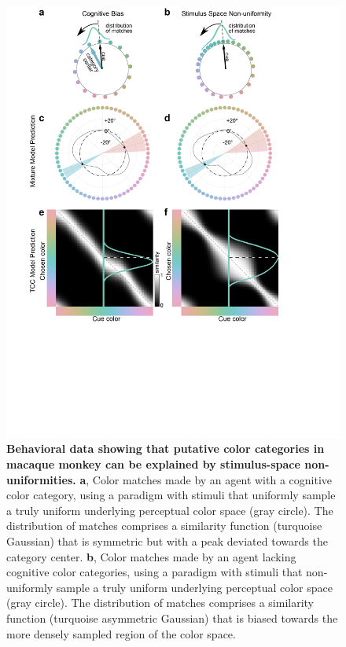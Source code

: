 \begin{figure}
    \begin{fullwidth}
    \centering
    \includegraphics[width=\textwidth+4cm,trim={0 7cm 0 0},clip]{../Figures/flat/F3_TCCModel_6.jpg}
    \caption{\textbf{Behavioral data showing that putative color categories in macaque monkey can be explained by stimulus-space non-uniformities.} \textbf{a}, Color matches made by an agent with a cognitive color category, using a paradigm with stimuli that uniformly sample a truly uniform underlying perceptual color space (gray circle). 
	The distribution of matches comprises a similarity function (turquoise Gaussian) that is symmetric but with a peak deviated towards the category center. 
	\textbf{b}, Color matches made by an agent lacking cognitive color categories, using a paradigm with stimuli that non-uniformly sample a truly uniform underlying perceptual color space (gray circle). 
	The distribution of matches comprises a similarity function (turquoise asymmetric Gaussian) that is biased towards the more densely sampled region of the color space. 
}
\end{fullwidth}
\end{figure}
